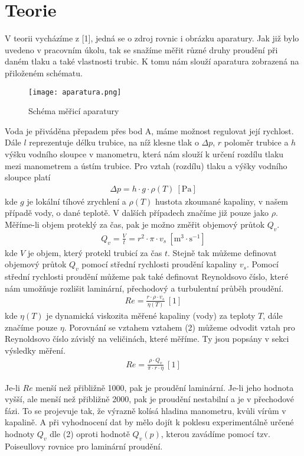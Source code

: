 \documentclass[a4paper]{article}
\begin{document}
\section*{Teorie}
\par V teorii vycházíme z [1], jedná se o zdroj rovnic i obrázku aparatury. Jak již bylo uvedeno v pracovním úkolu, tak se snažíme měřit různé druhy proudění při daném tlaku a také vlastnosti trubic. K tomu nám slouží aparatura zobrazená na přiloženém schématu.
\begin{figure}[H]
\centering
\caption{Schéma měřicí aparatury}
\texttt{[image: aparatura.png]}
\end{figure}
Voda je přiváděna přepadem přes bod A, máme možnost regulovat její rychlost. Dále $l$ reprezentuje délku trubice, na níž klesne tlak o $\Delta p$, $r$ poloměr trubice a $h$ výšku vodního sloupce v manometru, která nám slouží k určení rozdílu tlaku mezi manometrem a ústím trubice. Pro vztah (rozdílu) tlaku a výšky vodního sloupce platí
\begin{align}
\Delta p = h \cdot g \cdot \rho(T) \: \mathrm{[Pa]}
\end{align}
kde $g$ je lokální tíhové zrychlení a $\rho(T)$ hustota zkoumané kapaliny, v našem případě vody, o dané teplotě. V dalších případech značíme již pouze jako $\rho$. Měříme-li objem proteklý za čas, pak je možno změřit objemový průtok $Q_{v}$.
\begin{align}
Q_{v} = \frac{V}{t} = r^{2} \cdot \pi \cdot v_{s} \: \mathrm{[m^{3} \cdot s^{-1}]}
\end{align}
kde $V$ je objem, který protekl trubicí za čas $t$. Stejně tak můžeme definovat objemový průtok $Q_{v}$ pomocí střední rychlosti proudění kapaliny $v_{s}$. Pomocí střední rychlosti proudění můžeme pak také definovat Reynoldsovo číslo, které nám umožňuje rozlišit laminární, přechodový a turbulentní průběh proudění. 
\begin{align}
Re = \frac{r \cdot \rho \cdot v_{s}}{\eta(T)}  \: \mathrm{[1]}
\end{align}
kde $\eta(T)$ je dynamická viskozita měřené kapaliny (vody) za teploty $T$, dále značíme pouze $\eta$. Porovnání se vztahem vztahem (2) můžeme odvodit vztah pro Reynoldsovo číslo závislý na veličinách, které měříme. Ty jsou popsány v sekci výsledky měření.
\begin{align}
Re = \frac{\rho \cdot Q_{v}}{\pi \cdot r \cdot \eta}  \: \mathrm{[1]}
\end{align}
\par Je-li $Re$ menší než přibližně 1000, pak je proudění laminární. Je-li jeho hodnota vyšší, ale menší než přibližně 2000, pak je proudění nestabilní a je v přechodové fázi. To se projevuje tak, že výrazně kolísá hladina manometru, kvůli vírům v kapalině. A při vyhodnocení dat by mělo dojít k poklesu experimentálně určené hodnoty $Q_{v}$ dle (2) oproti hodnotě $Q_{v}(p)$, kterou zavádíme pomocí tzv. Poiseullovy rovnice pro laminární proudění.
\end{document}
